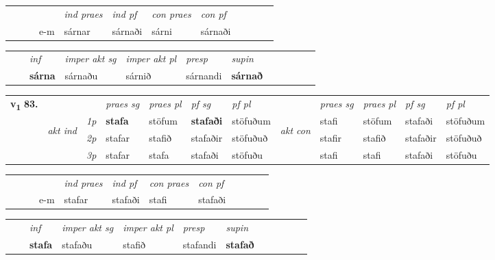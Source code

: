 \begin{tabular}{llllllllllll}
 & &  & &  \textit{ind praes} & \textit{ind pf} & \textit{con praes} & \textit{con pf} \\*
&  & & e-m & sárnar & sárnaði & sárni & sárnaði \\*
\cmidrule{5-9}
\end{tabular}


\begin{tabular}{llllllllllll}
 & & \textit{inf} & \textit{imper akt sg} & \textit{imper akt pl}   & \textit{presp} & \textit{supin}       \\*
  & & \textbf{sárna} & sárnaðu  & sárnið   & sárnandi &  \textbf{sárnað}   \\*
\cmidrule{1-12}
\end{tabular}



\begin{tabular}{llllllllllll} \toprule
\multirow{4}{*}{{{\textbf{v{\textsubscript{1}}} \Large{\textbf{83.}}}}}  & &   &  \textit{praes sg}  & \textit{praes pl}  &\textit{ pf sg} & \textit{pf pl} &  &  \textit{praes sg}  & \textit{praes pl}  & \textit{pf sg} & \textit{pf pl } \\*
	\cmidrule{4-7} \cmidrule{9-12}
 & \multirow{3}{*}{\begin{turn}{90}\textit{akt ind}\end{turn}} & {\textit{1p}} & \textbf{stafa} & stöfum    & \textbf{stafaði} & stöfuðum & \multirow{3}{*}{\begin{turn}{90}\textit{akt con}\end{turn}} &stafi & stöfum & stafaði & stöfuðum\\*
& &  {\textit{2p}} &  stafar  & stafið   & stafaðir & stöfuðuð & & stafir & stafið & stafaðir & stöfuðuð \\*
& &  {\textit{3p}} & stafar & stafa   & stafaði & stöfuðu & & stafi & stafi& stafaði & stöfuðu  \\*
\cmidrule{4-7} \cmidrule{9-12}
\end{tabular}


\begin{tabular}{llllllllllll}
 & &  & &  \textit{ind praes} & \textit{ind pf} & \textit{con praes} & \textit{con pf} \\*
&  & & e-m & stafar & stafaði & stafi & stafaði \\*
\cmidrule{5-9}
\end{tabular}


\begin{tabular}{llllllllllll}
 & & \textit{inf} & \textit{imper akt sg} & \textit{imper akt pl}   & \textit{presp} & \textit{supin}       \\*
  & & \textbf{stafa} & stafaðu  & stafið   & stafandi &  \textbf{stafað}   \\*
\cmidrule{1-12}
\end{tabular}



